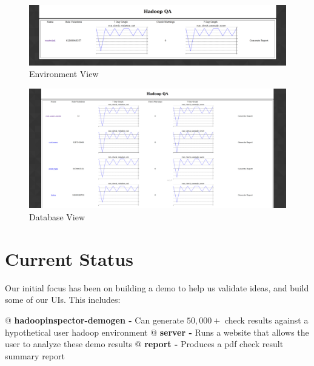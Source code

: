 \begin{figure}[H]
    \centering
    \includegraphics[scale=0.2]{./img/prod.png}
    \caption{Environment View}
\end{figure}

\begin{figure}[H]
    \centering
    \includegraphics[scale=0.2]{./img/westwind.png}
    \caption{Database View}
\end{figure}

\section{Current Status}
Our initial focus has been on building a demo to help us validate ideas, and build some of our UIs. This includes:

\begin{easylist}[itemize]
    @ \textbf{hadoopinspector-demogen -} Can generate $50,000+$ check results against a hypothetical user hadoop environment
    @ \textbf{server -} Runs a website that allows the user to analyze these demo results
    @ \textbf{report -} Produces a pdf check result summary report
\end{easylist}

